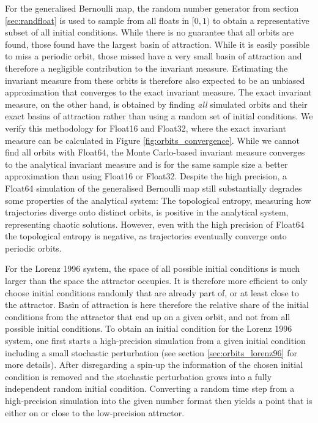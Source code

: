 For the generalised Bernoulli map, the random number generator from section \ref{sec:randfloat} is used to sample from all floats
in $[0,1)$ to obtain a representative subset of all initial conditions. While there is no guarantee that all orbits are found, those found
have the largest basin of attraction. While it is easily possible to miss a periodic orbit,
those missed have a very small basin of attraction and therefore a negligible contribution to the invariant measure. Estimating
the invariant measure from these orbits is therefore also expected to be an unbiased approximation that converges to the
exact invariant measure. The exact invariant measure, on the other hand, is obtained by finding \emph{all} simulated orbits
and their exact basins of attraction rather than using a random set of initial conditions. We verify this methodology for
Float16 and Float32, where the exact invariant measure can be calculated in Figure \ref{fig:orbits_convergence}. While we cannot
find all orbits with Float64, the Monte Carlo-based invariant measure converges to the analytical invariant measure and is
for the same sample size a better approximation than using Float16 or Float32. Despite the high precision, a Float64 simulation
of the generalised Bernoulli map still substantially degrades some properties of the analytical system: The topological entropy,
measuring how trajectories diverge onto distinct orbits, is positive in the analytical system, representing chaotic solutions.
However, even with the high precision of Float64 the topological entropy is negative, as trajectories eventually converge
onto periodic orbits.

For the Lorenz 1996 system, the space of all possible initial conditions is much larger than the space the attractor occupies.
It is therefore more efficient to only choose initial conditions randomly that are already part of, or at least close to the attractor.
Basin of attraction is here therefore the relative share of the initial conditions from the attractor that end up on a given orbit,
and not from all possible initial conditions. To obtain an initial condition for the Lorenz 1996 system, one first starts a high-precision
simulation from a given initial condition including a small stochastic perturbation (see section \ref{sec:orbits_lorenz96} for more
details). After disregarding a spin-up the information of the chosen initial condition is removed and the stochastic perturbation
grows into a fully independent random initial condition. Converting a random time step from a high-precision simulation into
the given number format then yields a point that is either on or close to the low-precision attractor.

